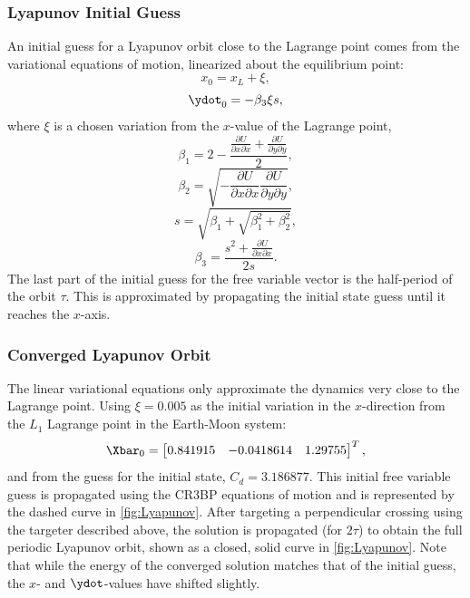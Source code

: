 \subsubsection{Lyapunov Initial Guess}
An initial guess for a Lyapunov orbit close to the Lagrange point comes from the variational
equations of motion, linearized about the equilibrium point:
\begin{equation}
    x_{0}=x_{L}+\xi,
    \label{eq:xvar}
\end{equation}
\begin{equation}
    \ydot_{0}=-\beta_{3}\xi s,
    \label{eq:ydotvar}
\end{equation}
where $\xi$ is a chosen variation from the $x$-value of the Lagrange point,
\begin{equation}
    \beta_{1}=2-\frac{\frac{\partial U}{\partial x\partial x}+\frac{\partial U}{\partial y\partial y}}{2},
    \label{eq:beta1}
\end{equation}
\vspace{1mm}
\begin{equation}
    \beta_{2}=\sqrt{-\frac{\partial U}{\partial x\partial x}\frac{\partial U}{\partial y\partial y}},
    \label{eq:beta2}
\end{equation}
\vspace{1mm}
\begin{equation}
    s=\sqrt{\beta_{1}+\sqrt{\beta_{1}^{2}+\beta_{2}^{2}}},
    \label{eq:s}
\end{equation}
\vspace{1mm}
\begin{equation}
    \beta_{3}=\frac{s^{2}+\frac{\partial U}{\partial x\partial x}}{2s}.
    \label{eq:beta3}
\end{equation}
The last part of the initial guess for the free variable vector is the half-period of the orbit
$\tau$. This is approximated by propagating the initial state guess until it reaches the $x$-axis.

\subsubsection{Converged Lyapunov Orbit}
The linear variational equations only approximate the dynamics very close to the Lagrange point.
Using $\xi=0.005$ as the initial variation in the $x$-direction from the $L_{1}$ Lagrange point in
the Earth-Moon system:
\begin{equation}
    \Xbar_{0}=\begin{bmatrix}   0.841915    &   -0.0418614  &   1.29755\end{bmatrix}^{T},
    \label{eq:Lyapunovguess}
\end{equation}
and from the guess for the initial state, $C_{d}=3.186877$. This initial free variable guess is
propagated using the CR3BP equations of motion and is represented by the dashed curve in
\cref{fig:Lyapunov}. After targeting a perpendicular crossing using the targeter described above,
the solution is propagated (for $2\tau$) to obtain the full periodic Lyapunov orbit, shown as a
closed, solid curve in \cref{fig:Lyapunov}. Note that while the energy of the converged solution
matches that of the initial guess, the $x$- and $\ydot$-values have shifted slightly.

